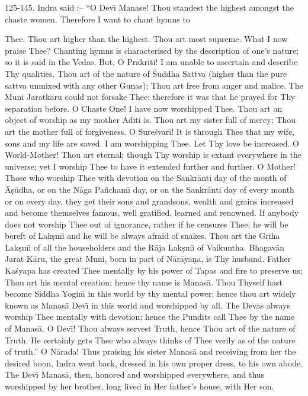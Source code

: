 125-145. Indra said :-- ``O Dev\={\i} Manase! Thou standest the highest amongst the chaste women. Therefore I want to chant hymns to

Thee. Thou art higher than the highest. Thou art most supreme. What I now praise Thee? Chanting hymns is characterised by the description of one's nature; so it is said in the Vedas. But, O Prakriti! I am unable to ascertain and describe Thy qualities. Thou art of the nature of \'Suddha Sattva (higher than the pure sattva unmixed with any other Gu\d{n}as); Thou art free from anger and malice. The Muni Jaratk\=aru could not forsake Thee; therefore it was that he prayed for Thy separation before. O Chaste One! I have now worshipped Thee. Thou art an object of worship as my mother Aditi is. Thou art my sister full of mercy; Thou art the mother full of forgiveness. O Sure\'svar\={\i}! It is through Thee that my wife, sons and my life are saved. I am worshipping Thee. Let Thy love be increased. O World-Mother! Thou art eternal; though Thy worship is extant everywhere in the universe; yet I worship Thee to have it extended further and further. O Mother! Those who worship Thee with devotion on the Sankr\=anti day of the month of \=A\d{s}\=udha, or on the N\=aga Pa\~ncham\={\i} day, or on the Sankr\=anti day of every month or on every day, they get their sons and grandsons, wealth and grains increased and become themselves famous, well gratified, learned and renowned. If anybody does not worship Thee out of ignorance, rather if he censures Thee, he will be bereft of Lak\d{s}m\={\i} and he will be always afraid of snakes. Thou art the Griha Lak\d{s}m\={\i} of all the householders and the R\=aja Lak\d{s}m\={\i} of Vaikuntha. Bhagav\=an Jarat K\=aru, the great Muni, born in part of N\=ar\=aya\d{n}a, is Thy husband. Father Ka\'syapa has created Thee mentally by his power of Tapas and fire to preserve us; Thou art his mental creation; hence thy name is Manas\=a. Thou Thyself hast become Siddha Yogin\={\i} in this world by thy mental power; hence thou art widely known as Manas\=a Dev\={\i} in this world and worshipped by all. The Devas always worship Thee mentally with devotion; hence the Pundits call Thee by the name of Manas\=a. O Dev\={\i}! Thou always servest Truth, hence Thou art of the nature of Truth. He certainly gets Thee who always thinks of Thee verily as of the nature of truth.'' O N\=arada! Thus praising his sister Manas\=a and receiving from her the desired boon, Indra went back, dressed in his own proper dress, to his own abode. The Dev\={\i} Manas\=a, then, honored and worshipped everywhere, and thus worshipped by her brother, long lived in Her father's house, with Her son.

